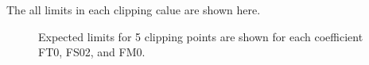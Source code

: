 The all limits in each clipping calue are shown here.

\begin{figure}[ht]
    \centering
        \caption{Expected limits for 5 clipping points are shown for each coefficient FT0, FS02, and FM0.}
        \label{fig:ClippedLimits}
\end{figure}

